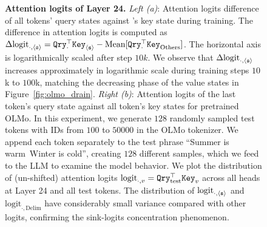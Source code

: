 \begin{figure}[h]
\begin{subfigure}[t]{0.32\textwidth}
        \label{fig:attention_logits_olmo_static}
    \end{subfigure}
    \hfill
    \phantom{.}
        \caption{\small \textbf{Attention logits of Layer 24.}  \textit{Left (a)}: Attention logits difference of all tokens' query states against \bos's key state during training. The difference in attention logits is computed as \(\Delta\mathrm{logit}_{\cdot,\texttt{$\langle \texttt{s}\rangle$}} = {\tt Qry}_{\cdot}^\top {\tt Key}_{\texttt{$\langle \texttt{s}\rangle$}} - \text{Mean}[{\tt Qry}_{\cdot}^\top {\tt Key}_{\text{Others}}]\). The horizontal axis is logarithmically scaled after step $10k$. We observe that $\Delta \mathrm{logit}_{\cdot,\texttt{$\langle \texttt{s}\rangle$}}$ increases approximately in logarithmic scale during training steps $10$k to $100$k, matching the decreasing phase of the value states in Figure~\ref{fig:olmo_drain}. 
        \textit{Right (b)}: Attention logits of the last token's query state against all token's key states for pretrained OLMo. In this experiment, we generate \(128\) randomly sampled test tokens with IDs from \(100\) to \(50000\) in the OLMo tokenizer. We append each token separately to the test phrase ``Summer is warm\period~Winter is cold\period'', creating \(128\) different samples, which we feed to the LLM to examine the model behavior. We plot the distribution of (un-shifted) attention logits \( \text{logit}_{\cdot,v}={\tt Qry}_{\mathrm{test}}^\top {\tt Key}_{v}\) across all heads at Layer 24 and all test tokens. The distribution of $\text{logit}_{\cdot,\texttt{$\langle \texttt{s}\rangle$}}$ and $\text{logit}_{\cdot,\text{Delim}}$ have considerably small variance compared with other logits, confirming the sink-logits concentration phenomenon. }

\end{figure}
